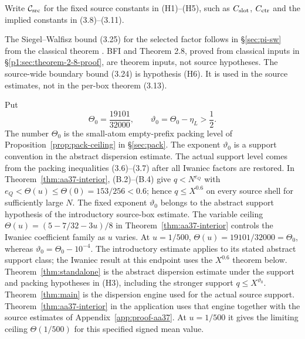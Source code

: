Write $\mathcal C_{\rm src}$ for the fixed source constants in
(H1)--(H5), such as $C_{\rm slot}$, $C_{\rm ctr}$ and the implied
constants in (3.8)--(3.11).

The Siegel--Walfisz bound (3.25) for the selected factor follows in
\S\ref{sec:pi-sw} from the classical theorem \cite[Corollary~5.29]{IK04}. BFI \cite{BFI86} and
Theorem 2.8, proved from classical inputs in
\S\ref{p1:sec:theorem-2-8-proof}, are theorem inputs, not source hypotheses.
The source-wide boundary bound (3.24) is hypothesis (H6). It is used
in the source estimates, not in the per-box theorem (3.13).

Put
\[
 \Theta_0=\frac{19101}{32000},\qquad
 \vartheta_0=\Theta_0-\eta_L>\frac12.
\tag{3.12a}
\]
The number $\Theta_0$ is the small-atom empty-prefix packing level
of Proposition~\ref{prop:pack-ceiling} in \S\ref{sec:pack}.
The exponent $\vartheta_0$ is a support convention in the abstract
dispersion estimate. The actual support level comes from the packing inequalities
(3.6)--(3.7) after all Iwaniec factors are restored.
In Theorem~\ref{thm:aa37-interior}, (B.2)--(B.4) give
$q<N^{e_Q}$ with $e_Q<\Theta(u)\le\Theta(0)=153/256<0.6$; hence
$q\le X^{0.6}$ on every source shell for sufficiently large $N$.
The fixed exponent $\vartheta_0$ belongs to the abstract support
hypothesis of the introductory source-box estimate. The variable ceiling
$\Theta(u)=(5-7/32-3u)/8$ in Theorem~\ref{thm:aa37-interior}
controls the Iwaniec coefficient family as $u$ varies.
At $u=1/500$, $\Theta(u)=19101/32000=\Theta_0$,
whereas $\vartheta_0=\Theta_0-10^{-4}$.
The introductory estimate applies to its stated abstract support class;
the Iwaniec result at this endpoint uses the $X^{0.6}$ theorem below.
Theorem~\ref{thm:standalone} is the abstract dispersion estimate under
the support and packing hypotheses in (H3), including the stronger
support $q\le X^{\vartheta_0}$.
Theorem~\ref{thm:main} is the dispersion engine used for the actual
source support. Theorem~\ref{thm:aa37-interior} in the application
uses that engine together with the source estimates of
Appendix~\ref{app:proof-aa37}. At $u=1/500$ it gives the limiting
ceiling $\Theta(1/500)$ for this specified signed mean value.

